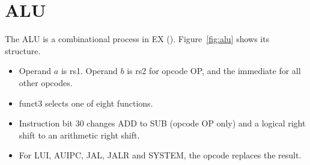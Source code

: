 \section{ALU}
\label{sec:alu}

The ALU is a combinational process in EX (). Figure~\ref{fig:alu} shows its structure.

\begin{itemize}
  \item Operand $a$ is rs1. Operand $b$ is rs2 for opcode OP, and the immediate for all other opcodes.
  \item funct3 selects one of eight functions.
  \item Instruction bit 30 changes ADD to SUB (opcode OP only) and a logical right shift to an arithmetic right shift.
  \item For LUI, AUIPC, JAL, JALR and SYSTEM, the opcode replaces the result.
\end{itemize}

